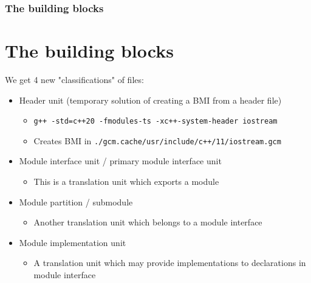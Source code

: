 \documentclass{beamer}
\begin{document}
%
%
\begin{frame}
\frametitle{The building blocks}
\section{The building blocks}
We get 4 new "classifications" of files:
\begin{itemize}
\item Header unit (temporary solution of creating a BMI from a header file)
\begin{itemize}
\item \texttt{g++ -std=c++20 -fmodules-ts -xc++-system-header iostream}
\item Creates BMI in \texttt{./gcm.cache/usr/include/c++/11/iostream.gcm}
\end{itemize}
\item Module interface unit / primary module interface unit
\begin{itemize}
\item This is a translation unit which exports a module
\end{itemize}
\item Module partition / submodule
\begin{itemize}
\item Another translation unit which belongs to a module interface
\end{itemize}
\item Module implementation unit
\begin{itemize}
\item A translation unit which may provide implementations to declarations
in module interface
\end{itemize}
\end{itemize}
\end{frame}
\end{document}
